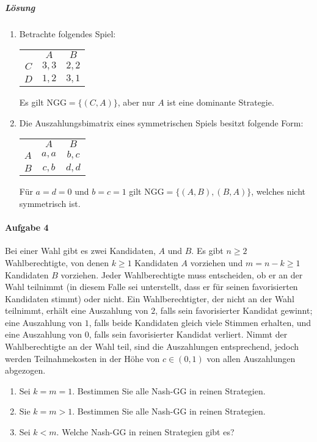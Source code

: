 \subparagraph{Lösung}%

\begin{enumerate}
  \item Betrachte folgendes Spiel:
    \begin{center}
      \begin{tabular}{ccc}
        & $A$ & $B$\\
        \cmidrule{2-3}
        $C$ & $3,3$ & $2,2$\\
        \cmidrule{2-3}
        $D$ & $1,2$ & $3,1$\\
        \cmidrule{2-3}
      \end{tabular}
    \end{center}
    Es gilt $\text{NGG} = \{(C,A)\}$, aber nur $A$ ist eine dominante Strategie.

  \item Die Auszahlungsbimatrix eines symmetrischen Spiels besitzt folgende Form:
    \begin{center}
      \begin{tabular}{ccc}
        & $A$ & $B$\\
        \cmidrule{2-3}
        $A$ & $a,a$ & $b,c$\\
        \cmidrule{2-3}
        $B$ & $c,b$ & $d,d$\\
        \cmidrule{2-3}
      \end{tabular}
    \end{center}
    Für $a=d=0$ und $b=c=1$ gilt $\text{NGG} = \{(A,B), (B,A)\}$, welches nicht
    symmetrisch ist.
\end{enumerate}

\paragraph{Aufgabe 4}%
\label{par:serie_3_aufgabe_4}

Bei einer Wahl gibt es zwei Kandidaten, $A$ und $B$.
Es gibt $n \geq 2$ Wahlberechtigte, von denen $k \geq 1$ Kandidaten $A$ vorziehen
und $m = n-k \geq 1$ Kandidaten $B$ vorziehen.
Jeder Wahlberechtigte muss entscheiden, ob er an der Wahl teilnimmt (in diesem Falle sei
unterstellt, dass er für seinen favorisierten Kandidaten stimmt) oder nicht.
Ein Wahlberechtigter, der nicht an der Wahl teilnimmt,
erhält eine Auszahlung von $2$, falls sein favorisierter Kandidat gewinnt;
eine Auszahlung von $1$, falls beide Kandidaten gleich viele Stimmen erhalten,
und eine Auszahlung von $0$, falls sein favorisierter Kandidat verliert.
Nimmt der Wahlberechtigte an der Wahl teil, sind die Auszahlungen entsprechend, jedoch
werden Teilnahmekosten in der Höhe von $c \in (0,1)$ von allen Auszahlungen abgezogen.
\begin{enumerate}
  \item Sei $k=m=1$. Bestimmen Sie alle Nash-GG in reinen Strategien.
  \item Sie $k=m>1$. Bestimmen Sie alle Nash-GG in reinen Strategien.
  \item Sei $k<m$. Welche Nash-GG in reinen Strategien gibt es?
\end{enumerate}

